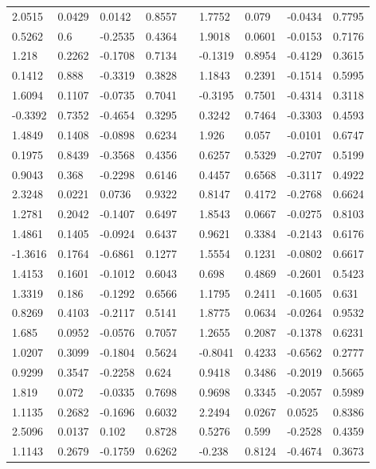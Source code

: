 \begin{table}[h!]
\begin{tabular}{lllllllll}
2.0515 & 0.0429 & 0.0142 & 0.8557 &  & 1.7752 & 0.079 & -0.0434 & 0.7795 \\
0.5262 & 0.6 & -0.2535 & 0.4364 &  & 1.9018 & 0.0601 & -0.0153 & 0.7176 \\
1.218 & 0.2262 & -0.1708 & 0.7134 &  & -0.1319 & 0.8954 & -0.4129 & 0.3615 \\
0.1412 & 0.888 & -0.3319 & 0.3828 &  & 1.1843 & 0.2391 & -0.1514 & 0.5995 \\
1.6094 & 0.1107 & -0.0735 & 0.7041 &  & -0.3195 & 0.7501 & -0.4314 & 0.3118 \\
-0.3392 & 0.7352 & -0.4654 & 0.3295 &  & 0.3242 & 0.7464 & -0.3303 & 0.4593 \\
1.4849 & 0.1408 & -0.0898 & 0.6234 &  & 1.926 & 0.057 & -0.0101 & 0.6747 \\
0.1975 & 0.8439 & -0.3568 & 0.4356 &  & 0.6257 & 0.5329 & -0.2707 & 0.5199 \\
0.9043 & 0.368 & -0.2298 & 0.6146 &  & 0.4457 & 0.6568 & -0.3117 & 0.4922 \\
2.3248 & 0.0221 & 0.0736 & 0.9322 &  & 0.8147 & 0.4172 & -0.2768 & 0.6624 \\
1.2781 & 0.2042 & -0.1407 & 0.6497 &  & 1.8543 & 0.0667 & -0.0275 & 0.8103 \\
1.4861 & 0.1405 & -0.0924 & 0.6437 &  & 0.9621 & 0.3384 & -0.2143 & 0.6176 \\
-1.3616 & 0.1764 & -0.6861 & 0.1277 &  & 1.5554 & 0.1231 & -0.0802 & 0.6617 \\
1.4153 & 0.1601 & -0.1012 & 0.6043 &  & 0.698 & 0.4869 & -0.2601 & 0.5423 \\
1.3319 & 0.186 & -0.1292 & 0.6566 &  & 1.1795 & 0.2411 & -0.1605 & 0.631 \\
0.8269 & 0.4103 & -0.2117 & 0.5141 &  & 1.8775 & 0.0634 & -0.0264 & 0.9532 \\
1.685 & 0.0952 & -0.0576 & 0.7057 &  & 1.2655 & 0.2087 & -0.1378 & 0.6231 \\
1.0207 & 0.3099 & -0.1804 & 0.5624 &  & -0.8041 & 0.4233 & -0.6562 & 0.2777 \\
0.9299 & 0.3547 & -0.2258 & 0.624 &  & 0.9418 & 0.3486 & -0.2019 & 0.5665 \\
1.819 & 0.072 & -0.0335 & 0.7698 &  & 0.9698 & 0.3345 & -0.2057 & 0.5989 \\
1.1135 & 0.2682 & -0.1696 & 0.6032 &  & 2.2494 & 0.0267 & 0.0525 & 0.8386 \\
2.5096 & 0.0137 & 0.102 & 0.8728 &  & 0.5276 & 0.599 & -0.2528 & 0.4359 \\
1.1143 & 0.2679 & -0.1759 & 0.6262 &  & -0.238 & 0.8124 & -0.4674 & 0.3673 \\

\end{tabular}
\end{table}
